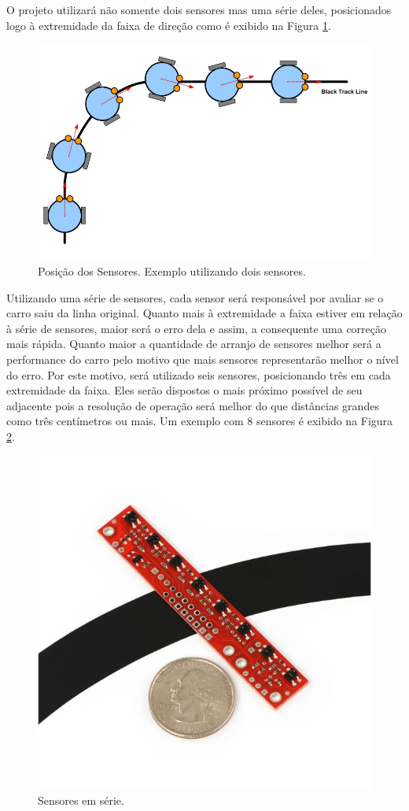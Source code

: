 \documentclass[portugues, brazil, a4paper,12pt]{article}
\begin{document}
		O projeto utilizará não somente dois sensores mas uma série deles, posicionados logo à extremidade da faixa de direção como é exibido na Figura \ref{fig:dois_sensores}.
		
		\begin{figure}[H]
			\centering
			\includegraphics[width=0.9\linewidth]{img/eq-line-tracking.png}
			\caption{Posição dos Sensores. Exemplo utilizando dois sensores.}
			\label{fig:dois_sensores}
		\end{figure}
	
		Utilizando uma série de sensores, cada sensor será responsável por avaliar se o carro saiu da linha original. Quanto mais à extremidade a faixa estiver em relação à série de sensores, maior será o erro dela e assim, a consequente uma correção mais rápida. Quanto maior a quantidade de arranjo de sensores melhor será a performance do carro pelo motivo que mais sensores representarão melhor o nível do erro. Por este motivo, será utilizado seis sensores, posicionando três em cada extremidade da faixa. Eles serão dispostos o mais próximo possível de seu adjacente pois a resolução de operação será melhor do que distâncias grandes como três centímetros ou mais. Um exemplo com 8 sensores é exibido na Figura \ref{fig:sensores_series}. 
	
		\begin{figure}
			\centering
			\includegraphics[width=0.7\linewidth]{img/eq-sensores_series.jpg}
			\caption{Sensores em série.}
			\label{fig:sensores_series}
		\end{figure}
\end{document}
